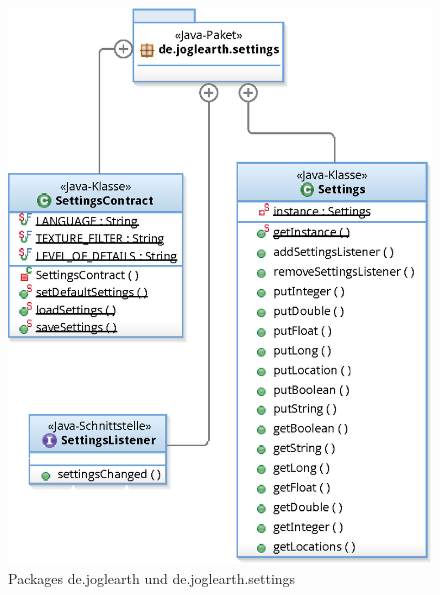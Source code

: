 \documentclass[10pt]{scrreprt}
\begin{document}
\begin{figure}[!htb]
\begin{minipage}[c]{6cm}
			\includegraphics[scale=0.55]{de_joglearth_settings.eps}
        \end{minipage}
        \caption{Packages de.joglearth und de.joglearth.settings}
\end{figure}

\vspace{5mm}
\end{document}
